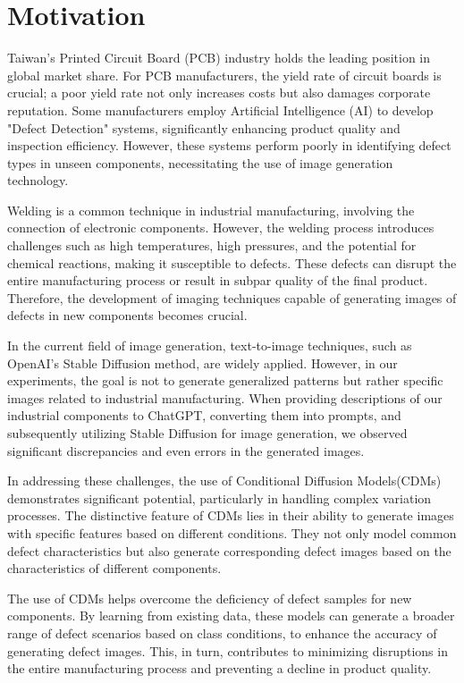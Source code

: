 \section{Motivation}
Taiwan's Printed Circuit Board (PCB) industry holds the leading position in global market share. For PCB manufacturers, the yield rate of circuit boards is crucial; a poor yield rate not only increases costs but also damages corporate reputation. Some manufacturers employ Artificial Intelligence (AI) to develop "Defect Detection" systems, significantly enhancing product quality and inspection efficiency. However, these systems perform poorly in identifying defect types in unseen components, necessitating the use of image generation technology.

Welding is a common technique in industrial manufacturing, involving the connection of electronic components. However, the welding process introduces challenges such as high temperatures, high pressures, and the potential for chemical reactions, making it susceptible to defects. These defects can disrupt the entire manufacturing process or result in subpar quality of the final product. Therefore, the development of imaging techniques capable of generating images of defects in new components becomes crucial.

In the current field of image generation, text-to-image techniques, such as OpenAI's Stable Diffusion\cite{Stable_Diffusion} method, are widely applied. However, in our experiments, the goal is not to generate generalized patterns but rather specific images related to industrial manufacturing. When providing descriptions of our industrial components to ChatGPT, converting them into prompts, and subsequently utilizing Stable Diffusion for image generation, we observed significant discrepancies and even errors in the generated images.

In addressing these challenges, the use of Conditional Diffusion Models(CDMs) demonstrates significant potential, particularly in handling complex variation processes. The distinctive feature of CDMs lies in their ability to generate images with specific features based on different conditions. They not only model common defect characteristics but also generate corresponding defect images based on the characteristics of different components.

The use of CDMs helps overcome the deficiency of defect samples for new components. By learning from existing data, these models can generate a broader range of defect scenarios based on class conditions, to enhance the accuracy of generating defect images. This, in turn, contributes to minimizing disruptions in the entire manufacturing process and preventing a decline in product quality.


